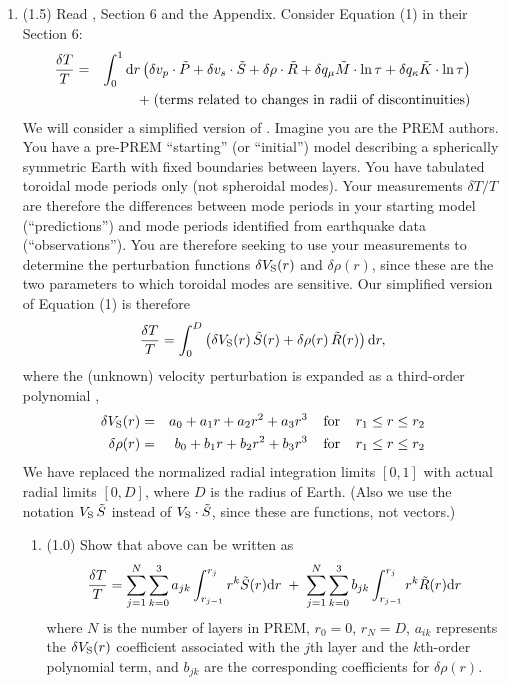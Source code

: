 \documentclass[11pt,titlepage,fleqn]{article}
\begin{document}
\begin{enumerate}
\item (1.5) Read \citet{PREM}, Section 6 and the Appendix. Consider Equation (1) in their Section 6:
%
\begin{eqnarray}
\frac{\delta T}{T} &=& \int_0^1 \mathrm{d} r \left(
\delta v_p \cdot \tilde{P} + 
\delta v_s \cdot \tilde{S} +
\delta\rho \cdot \tilde{R} +
\delta q_\mu \tilde{M} \cdot \ln\tau +
\delta q_\kappa \tilde{K} \cdot \ln\tau
\right)
\nonumber \\
&& + \; \text{(terms related to changes in radii of discontinuities)}
\label{dTprem}
\end{eqnarray}
%
We will consider a simplified version of .
Imagine you are the PREM authors. You have a pre-PREM ``starting'' (or ``initial'') model describing a spherically symmetric Earth with fixed boundaries between layers. You have tabulated toroidal mode periods only (not spheroidal modes). Your measurements $\delta T/T$ are therefore the differences between mode periods in your starting model (``predictions'') and mode periods identified from earthquake data (``observations''). You are therefore seeking to use your measurements to determine the perturbation functions $\delta V_{\rm S}(r)$ and $\delta\rho(r)$, since these are the two parameters to which toroidal modes are sensitive. Our simplified version of Equation (1) is therefore
%
\begin{equation}
\frac{\delta T}{T} = \int_0^D \left(\delta V_{\rm S}(r) \, \tilde{S}(r) + \delta\rho(r) \, \tilde{R}(r)\right) \mathrm{d} r,
\label{dT1}
\end{equation}
%
where the (unknown) velocity perturbation is expanded as a third-order polynomial \citep[][p.~307]{PREM},
%
\begin{eqnarray*}
\delta V_{\rm S}(r) &=& a_0 + a_1 r + a_2 r^2 + a_3 r^3
\;\;\;\;{\rm for}\;\;\;\; r_1 \le r \le r_2
\\
\delta\rho(r) &=& b_0 + b_1 r + b_2 r^2 + b_3 r^3
\;\;\;\;{\rm for}\;\;\;\; r_1 \le r \le r_2
\label{dvs}
\end{eqnarray*}
%
We have replaced the normalized radial integration limits $[0,1]$ with actual radial limits $[0,D]$, where $D$ is the radius of Earth. (Also we use the notation $V_{\rm S}\,\tilde{S}$ instead of $V_{\rm S} \cdot \tilde{S}$, since these are functions, not vectors.)

\begin{enumerate}
\item (1.0) Show that  above can be written as
%
\begin{equation}
\frac{\delta T}{T} = \sum_{j=1}^N \sum_{k=0}^3 a_{jk} \int_{r_{j-1}}^{r_j} r^{k} \tilde{S}(r) \mathrm{d} r
\;+\; \sum_{j=1}^N \sum_{k=0}^3 b_{jk} \int_{r_{j-1}}^{r_j} r^{k} \tilde{R}(r) \mathrm{d} r
\label{dT2}
\end{equation}
%
where $N$ is the number of layers in PREM, $r_0 = 0$, $r_N = D$, $a_{ik}$ represents the $\delta V_{\rm S}(r)$ coefficient associated with the $j$th layer and the $k$th-order polynomial term, and $b_{jk}$ are the corresponding coefficients for $\delta\rho(r)$.


\end{enumerate}
\end{enumerate}
\end{document}
